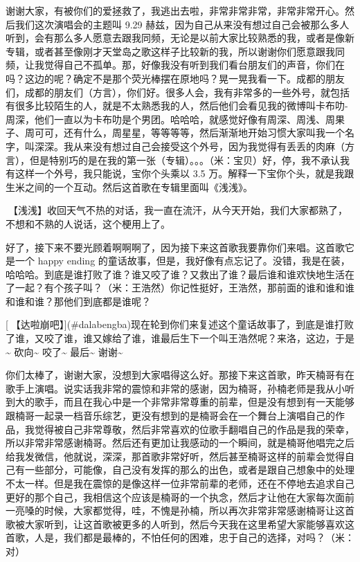\documentclass[
]{book}
\begin{document}
谢谢大家，有被你们的爱拯救了，我逃出去啦，非常非常非常，非常非常开心。然后我们这次演唱会的主题叫 9.29 赫兹，因为自己从来没有想过自己会被那么多人听到，会有那么多人愿意去跟我同频，无论是以前大家比较熟悉的我，或者是像新专辑，或者甚至像刚才天堂岛之歌这样子比较新的我，所以谢谢你们愿意跟我同频，让我觉得自己不孤单。那，好像我没有听到我们看台朋友们的声音，你们在吗？这边的呢？确定不是那个荧光棒摆在原地吗？晃一晃我看一下。成都的朋友们，成都的朋友们（方言），你们好。很多人会，我有非常多的一些外号，就包括有很多比较陌生的人，就是不太熟悉我的人，然后他们会看见我的微博叫卡布叻-周深，他们一直以为卡布叻是个男团。哈哈哈，就感觉好像有周深、周浅、周果子、周可可，还有什么，周星星，等等等等，然后渐渐地开始习惯大家叫我一个名字，叫深深。我从来没有想过自己会接受这个外号，因为我觉得有丢丢的肉麻（方言），但是特别巧的是在我的第一张（专辑）。。。（米：宝贝）好，停，我不承认我有这样一个外号，我只能说，宝你个头乘以 3.5 万。解释一下宝你个头，就是我跟生米之间的一个互动。然后这首歌在专辑里面叫《浅浅》。

🎵【浅浅】收回天气不热的对话，我一直在流汗，从今天开始，我们大家都熟了，不想和不熟的人说话，这个梗用上了。

好了，接下来不要光顾着啊啊啊了，因为接下来这首歌我要靠你们来唱。这首歌它是一个 happy ending 的童话故事，但是，我好像有点忘记了。没错，我是在装，哈哈哈。到底是谁打败了谁？谁又咬了谁？又救出了谁？最后谁和谁欢快地生活在了一起？有个孩子叫？（米：王浩然）你记性挺好，王浩然，那前面的谁和谁和谁和谁和谁？那他们到底都是谁呢？

[🎵【达啦崩吧】](#dalabengba)现在轮到你们来复述这个童话故事了，到底是谁打败了谁，又咬了谁，谁又嫁给了谁，谁最后生下一个叫王浩然呢？来洛，这边，于是\textasciitilde{} 砍向\textasciitilde{} 咬了\textasciitilde{} 最后\textasciitilde{} 谢谢\textasciitilde{}

你们太棒了，谢谢大家，没想到大家唱得这么好。那接下来这首歌，昨天楠哥有在歌手上演唱。说实话我非常的震惊和非常的感谢，因为楠哥，孙楠老师是我从小听到大的歌手，而且在我心中是一个非常非常尊重的前辈，但是没有想到有一天能够跟楠哥一起录一档音乐综艺，更没有想到的是楠哥会在一个舞台上演唱自己的作品，我觉得被自己非常尊敬，然后非常喜欢的位歌手翻唱自己的作品是我的荣幸，所以非常非常感谢楠哥。然后还有更加让我感动的一个瞬间，就是楠哥他唱完之后给我发微信，他就说，深深，那首歌非常好听，然后甚至楠哥这样的前辈会觉得自己有一些部分，可能像，自己没有发挥的那么的出色，或者是跟自己想象中的处理不太一样。但是我在震惊的是像这样一位非常前辈的老师，还在不停地去追求自己更好的那个自己，我相信这个应该是楠哥的一个执念，然后才让他在大家每次面前一亮嗓的时候，大家都觉得，哇，不愧是孙楠，所以再次非常非常感谢楠哥让这首歌被大家听到，让这首歌被更多的人听到，然后今天我在这里希望大家能够喜欢这首歌，人是，我们都是最棒的，不怕任何的困难，忠于自己的选择，对吗？（米：对）
\end{document}

